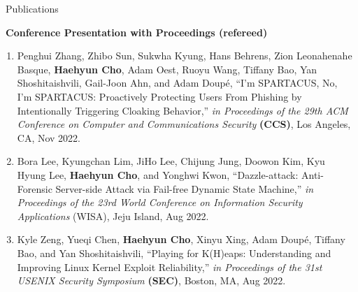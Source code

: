 \documentclass{resume} %
\begin{document}
\begin{rSection}{\faGenderless~Publications}



    \strut\textbullet~{\bf Conference Presentation with Proceedings (refereed)}
    \begin{enumerate}[leftmargin=0pt]
		\item Penghui Zhang, Zhibo Sun, Sukwha Kyung, Hans Behrens, Zion Leonahenahe Basque, \textbf{Haehyun Cho}, Adam Oest, Ruoyu Wang, Tiffany Bao, Yan Shoshitaishvili, Gail-Joon Ahn, and Adam Doup\'e, 
		``I'm SPARTACUS, No, I'm SPARTACUS: Proactively Protecting Users From Phishing by Intentionally Triggering Cloaking Behavior,''
		\emph{in Proceedings of the 29th ACM Conference on Computer and Communications Security} \textbf{(CCS)},
		Los Angeles, CA, Nov 2022.

		\item Bora Lee, Kyungchan Lim, JiHo Lee, Chijung Jung, Doowon Kim, Kyu Hyung Lee, \textbf{Haehyun Cho}, and Yonghwi Kwon,
		``Dazzle-attack: Anti-Forensic Server-side Attack via Fail-free Dynamic State Machine,''
		\emph{in Proceedings of the 23rd World Conference on Information Security Applications} (WISA), 
		Jeju Island, Aug 2022.
		
		\item Kyle Zeng, Yueqi Chen, \textbf{Haehyun Cho}, Xinyu Xing, Adam Doup\'e, Tiffany Bao, and Yan Shoshitaishvili,
		``Playing for K(H)eaps: Understanding and Improving Linux Kernel Exploit Reliability,'' 
		\emph{in Proceedings of the 31st USENIX Security Symposium} \textbf{(SEC)},
		Boston, MA, Aug 2022.




\end{enumerate}
\end{rSection}
\end{document}
